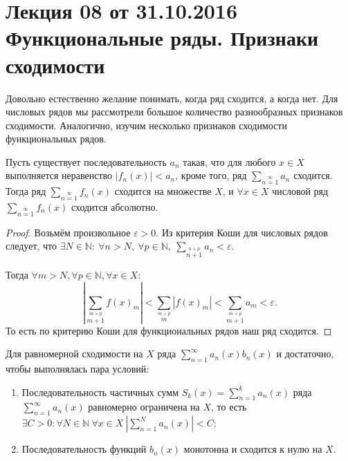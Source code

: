 \documentclass[a4paper, 12pt]{article}
\begin{document}
\pagestyle{fancy}
\section{Лекция 08 от 31.10.2016 \\ Функциональные ряды. Признаки сходимости}
	
	Довольно естественно желание понимать, когда ряд сходится, а когда нет. Для числовых рядов мы рассмотрели большое количество разнообразных признаков сходимости. Аналогично, изучим несколько признаков сходимости функциональных рядов.
	
	\begin{Test}
		
		Пусть существует последовательность $a_n$ такая, что для любого $x\in X$ выполняется неравенство $|f_n(x)|<a_n$, кроме того, ряд $\sum_{n=1}\limits^{\infty}a_n$ сходится. Тогда ряд $\sum_{n=1}\limits^{\infty}f_n(x)$ сходится на множестве $X$, и $\forall x \in X$ числовой ряд $\sum_{n=1}\limits^{\infty}f_n(x)$ сходится абсолютно.
	\end{Test}
	
	\begin{proof}
		
		Возьмём произвольное $\varepsilon>0$. Из критерия Коши для числовых рядов следует, что $\exists N\in \mathbb{N}: \ \forall n>N, \ \forall p\in \mathbb{N}, \ \sum_{n+1}\limits^{n+p}a_n < \varepsilon$.
		
		Тогда $\forall m>N, \forall p\in \mathbb{N}, \forall x \in X:$
		\[
		\left| \sum_{m+1}\limits^{m+p}f(x)_m\right|  < \sum_{m}\limits^{m+p} |f(x)_m| <  \sum_{m+1}\limits^{m+p}a_m < \varepsilon.
		\]
		То есть по критерию Коши для функциональных рядов наш ряд сходится.
	\end{proof}
	
	\begin{Test}
		Для равномерной сходимости на $X$ ряда $\sum\limits_{n = 1}^\infty a_n(x) b_n(x)$  и достаточно, чтобы выполнялась пара условий:
		\begin{enumerate}
			\item  Последовательность частичных сумм $ S_k(x)= \sum\limits_{n = 1}^k a_n(x) $  ряда $\sum\limits_{n = 1}^\infty a_n(x) $ равномерно ограничена на $X$, то есть $\exists C>0 : \forall N\in \mathbb{N} \ \forall x \in X \  \left| \sum\limits_{n = 1}^N a_n(x)\right|  <C$;
			
			\item  Последовательность функций $b_n(x)$ монотонна и сходится к нулю на $X$.
		\end{enumerate}
	\end{Test}
	
\end{document}
